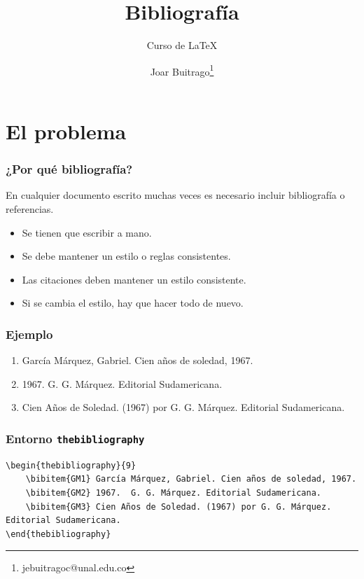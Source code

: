 \documentclass[12pt,aspectratio=169,ignorenonframetext]{ltxbeamer}
\title{Bibliografía}
\subtitle{Curso de {\lmr\LaTeX}}
\author{Joar Buitrago\texorpdfstring{\thanks{jebuitragoc@unal.edu.co}}{ <jebuitragoc@unal.edu.co>}}
\date{}
\begin{document}
\begin{frame}
\maketitle
\end{frame}





\section{El problema}

\begin{frame}
\frametitle{¿Por qué bibliografía?}

En cualquier documento escrito muchas veces es necesario incluir bibliografía o referencias.

\pause

\begin{itemize}[<+->]
    \item Se tienen que escribir a mano.
    \item Se debe mantener un estilo o reglas consistentes.
    \item Las citaciones deben mantener un estilo consistente.
    \item Si se cambia el estilo, hay que hacer todo de nuevo.
\end{itemize}
\end{frame}





\begin{frame}
\frametitle{Ejemplo}

\begin{enumerate}
    \lmr
    \item García Márquez, Gabriel. Cien años de soledad, 1967.
    \item 1967.  G. G. Márquez. Editorial Sudamericana.
    \item Cien Años de Soledad. (1967) por G. G. Márquez. Editorial Sudamericana.
\end{enumerate}
\end{frame}




\begin{frame}[fragile]
\frametitle{Entorno \texttt{thebibliography}}

    \begin{verbatim}
\begin{thebibliography}{9}
    \bibitem{GM1} García Márquez, Gabriel. Cien años de soledad, 1967.
    \bibitem{GM2} 1967.  G. G. Márquez. Editorial Sudamericana.
    \bibitem{GM3} Cien Años de Soledad. (1967) por G. G. Márquez. Editorial Sudamericana.
\end{thebibliography}
    \end{verbatim}
\end{frame}
\end{document}
